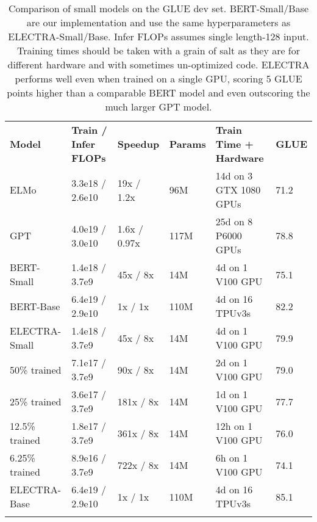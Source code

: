 \documentclass{article}
\newcommand\tstrut{\rule{0pt}{2.6ex}}
\newcommand\bstrut{\rule[-1.0ex]{0pt}{0pt}}
\newcommand{\thinline}{\Xhline{1.5\arrayrulewidth}}
\newcommand{\thickline}{\Xhline{2.5\arrayrulewidth}}
\newcommand{\tsep}	{\bstrut \\ \thinline}
\newcommand{\ttop}{\thickline}
\newcommand{\tbottom}{\bstrut \\ \thickline}
\begin{document}
\addtolength{\tabcolsep}{-1.2pt}
\begin{table*}[t!]
\small
\begin{center}
\begin{tabularx}{\linewidth}{X l l l l l}
\ttop
\textbf{Model} & \textbf{Train / Infer FLOPs} & \textbf{Speedup} & \textbf{Params} & \textbf{Train Time + Hardware} & \textbf{GLUE} \tstrut \tsep
ELMo & 3.3e18 / 2.6e10  & 19x / 1.2x & 96M & 14d on 3 GTX 1080 GPUs & 71.2 \tstrut \\
GPT & 4.0e19 / 3.0e10 & 1.6x / 0.97x & 117M & 25d on 8 P6000 GPUs & 78.8 \\
BERT-Small & 1.4e18 / 3.7e9 & 45x / 8x  & 14M & 4d on 1 V100 GPU  & 75.1 \\
BERT-Base & 6.4e19 / 2.9e10 & 1x / 1x & 110M & 4d on 16 TPUv3s &  82.2 \tsep
ELECTRA-Small & 1.4e18 / 3.7e9 & 45x / 8x & 14M & 4d on 1 V100 GPU & 79.9 \tstrut \\
\hspace{3mm}50\% trained & 7.1e17 / 3.7e9 & 90x / 8x & 14M & 2d on 1 V100 GPU & 79.0 \\
\hspace{3mm}25\% trained & 3.6e17 / 3.7e9 & 181x / 8x & 14M & 1d on 1 V100 GPU & 77.7 \\
\hspace{3mm}12.5\% trained & 1.8e17 / 3.7e9 & 361x / 8x & 14M & 12h on 1 V100 GPU & 76.0 \\
\hspace{3mm}6.25\% trained & 8.9e16 / 3.7e9 & 722x / 8x & 14M & 6h on 1 V100 GPU & 74.1 \\
ELECTRA-Base & 6.4e19 / 2.9e10 & 1x / 1x & 110M & 4d on 16 TPUv3s & 85.1 \tbottom
\end{tabularx} 
\end{center}
\vspace{-1mm}
\caption{Comparison of small models on the GLUE dev set.
BERT-Small/Base are our implementation and use the same hyperparameters as ELECTRA-Small/Base. 
Infer FLOPs assumes single length-128 input. 
Training times should be taken with a grain of salt as they are for different hardware and with sometimes un-optimized code.
ELECTRA performs well even when trained on a single GPU, scoring 5 GLUE points higher than a comparable BERT model and even outscoring the much larger GPT model.
}
\label{tab:small}
\end{table*}
\addtolength{\tabcolsep}{1.2pt}
\vspace{-0.0mm}
\end{document}
